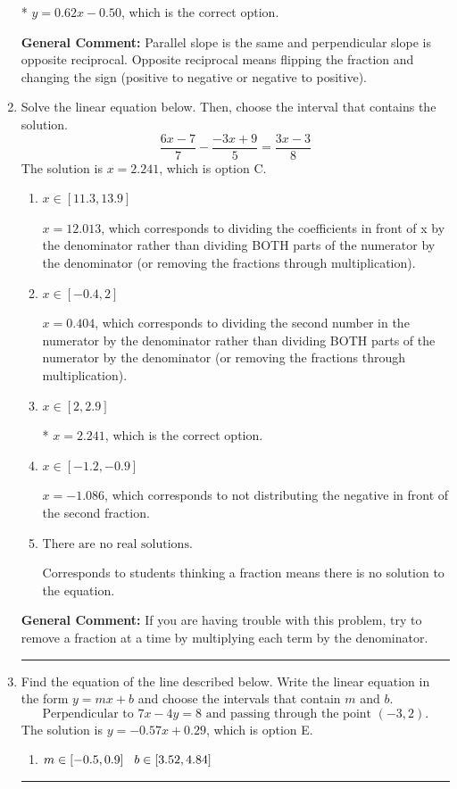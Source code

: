 \documentclass{extbook}[14pt]
\newcommand{\litem}[1]{\item #1

\rule{\textwidth}{0.4pt}}
\begin{document}
\begin{enumerate}
{\begin{enumerate}[label=\Alph*.]
* $y = 0.62x - 0.50$, which is the correct option.
\end{enumerate}

\textbf{General Comment:} Parallel slope is the same and perpendicular slope is opposite reciprocal. Opposite reciprocal means flipping the fraction and changing the sign (positive to negative or negative to positive).
}
\litem{
Solve the linear equation below. Then, choose the interval that contains the solution.
\[ \frac{6x -7}{7} - \frac{-3x + 9}{5} = \frac{3x -3}{8} \]The solution is \( x = 2.241 \), which is option C.\begin{enumerate}[label=\Alph*.]
\item \( x \in [11.3, 13.9] \)

 $x = 12.013$, which corresponds to dividing the coefficients in front of x by the denominator rather than dividing BOTH parts of the numerator by the denominator (or removing the fractions through multiplication).
\item \( x \in [-0.4, 2] \)

 $x = 0.404$, which corresponds to dividing the second number in the numerator by the denominator rather than dividing BOTH parts of the numerator by the denominator (or removing the fractions through multiplication).
\item \( x \in [2, 2.9] \)

* $x = 2.241$, which is the correct option.
\item \( x \in [-1.2, -0.9] \)

 $x = -1.086$, which corresponds to not distributing the negative in front of the second fraction.
\item \( \text{There are no real solutions.} \)

Corresponds to students thinking a fraction means there is no solution to the equation.
\end{enumerate}

\textbf{General Comment:} If you are having trouble with this problem, try to remove a fraction at a time by multiplying each term by the denominator.
}
\litem{
Find the equation of the line described below. Write the linear equation in the form $ y=mx+b $ and choose the intervals that contain $m$ and $b$.
\[ \text{Perpendicular to } 7 x - 4 y = 8 \text{ and passing through the point } (-3, 2). \]The solution is \( y = -0.57x + 0.29 \), which is option E.\begin{enumerate}[label=\Alph*.]
\item \( m \in [-0.5, 0.9] \hspace*{3mm} b \in [3.52, 4.84] \)


\end{enumerate}}
\end{enumerate}
\end{document}
